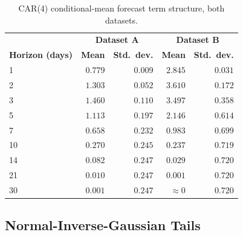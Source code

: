 \documentclass[11pt, a4paper, twoside]{article}
\begin{document}
\begin{table}[htbp]
\centering
\small
\caption{CAR(4) conditional-mean forecast term structure, both datasets.}
\label{tab:car4-forecast}
\begin{tabular}{l r r r r}
\toprule
& \multicolumn{2}{c}{\textbf{Dataset A}} & \multicolumn{2}{c}{\textbf{Dataset B}} \\
\textbf{Horizon (days)} & \textbf{Mean} & \textbf{Std.\ dev.} & \textbf{Mean} & \textbf{Std.\ dev.} \\
\midrule
1 & $0.779$ & $0.009$ & $2.845$ & $0.031$ \\
2 & $1.303$ & $0.052$ & $3.610$ & $0.172$ \\
3 & $1.460$ & $0.110$ & $3.497$ & $0.358$ \\
5 & $1.113$ & $0.197$ & $2.146$ & $0.614$ \\
7 & $0.658$ & $0.232$ & $0.983$ & $0.699$ \\
10 & $0.270$ & $0.245$ & $0.237$ & $0.719$ \\
14 & $0.082$ & $0.247$ & $0.029$ & $0.720$ \\
21 & $0.010$ & $0.247$ & $0.001$ & $0.720$ \\
30 & $0.001$ & $0.247$ & $\approx 0$ & $0.720$ \\
\bottomrule
\end{tabular}
\end{table}

\subsection{Normal-Inverse-Gaussian Tails}
\label{sec:phase4-nig}
\end{document}
